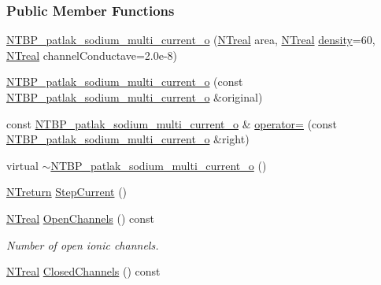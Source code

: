 \subsubsection*{Public Member Functions}
\begin{DoxyCompactItemize}
\item 
\hyperlink{class_n_t_b_p__patlak__sodium__multi__current__o_ae9fd1fcbc844d498c4399b3413ab75c6}{NTBP\_\-patlak\_\-sodium\_\-multi\_\-current\_\-o} (\hyperlink{nt__types_8h_a814a97893e9deb1eedcc7604529ba80d}{NTreal} area, \hyperlink{nt__types_8h_a814a97893e9deb1eedcc7604529ba80d}{NTreal} \hyperlink{class_n_t_b_p__multi__current__o_a82138baaa276b09c13038ca1fd6f08a7}{density}=60, \hyperlink{nt__types_8h_a814a97893e9deb1eedcc7604529ba80d}{NTreal} channelConductave=2.0e-\/8)
\item 
\hyperlink{class_n_t_b_p__patlak__sodium__multi__current__o_adc1b9f7a75a0fb4ce996aff8bf0cb575}{NTBP\_\-patlak\_\-sodium\_\-multi\_\-current\_\-o} (const \hyperlink{class_n_t_b_p__patlak__sodium__multi__current__o}{NTBP\_\-patlak\_\-sodium\_\-multi\_\-current\_\-o} \&original)
\item 
const \hyperlink{class_n_t_b_p__patlak__sodium__multi__current__o}{NTBP\_\-patlak\_\-sodium\_\-multi\_\-current\_\-o} \& \hyperlink{class_n_t_b_p__patlak__sodium__multi__current__o_aa359133ac9730e64609961017d3a22b9}{operator=} (const \hyperlink{class_n_t_b_p__patlak__sodium__multi__current__o}{NTBP\_\-patlak\_\-sodium\_\-multi\_\-current\_\-o} \&right)
\item 
virtual \hyperlink{class_n_t_b_p__patlak__sodium__multi__current__o_ad9afbd5d9ebf3433e17413a6b1a22a08}{$\sim$NTBP\_\-patlak\_\-sodium\_\-multi\_\-current\_\-o} ()
\item 
\hyperlink{nt__types_8h_ab9564ee8f091e809d21b8451c6683c53}{NTreturn} \hyperlink{class_n_t_b_p__patlak__sodium__multi__current__o_aa0cd06f30a1410745e6ee04dc12a8704}{StepCurrent} ()
\item 
\hyperlink{nt__types_8h_a814a97893e9deb1eedcc7604529ba80d}{NTreal} \hyperlink{class_n_t_b_p__patlak__sodium__multi__current__o_a136a9585bf0e8409a85cb342b3ea26ae}{OpenChannels} () const 
\begin{DoxyCompactList}\small\item\em Number of open ionic channels. \item\end{DoxyCompactList}\item 
\hyperlink{nt__types_8h_a814a97893e9deb1eedcc7604529ba80d}{NTreal} \hyperlink{class_n_t_b_p__patlak__sodium__multi__current__o_aef8e93f92cfea1cf076a6fe38f464907}{ClosedChannels} () const 

\end{DoxyCompactItemize}
